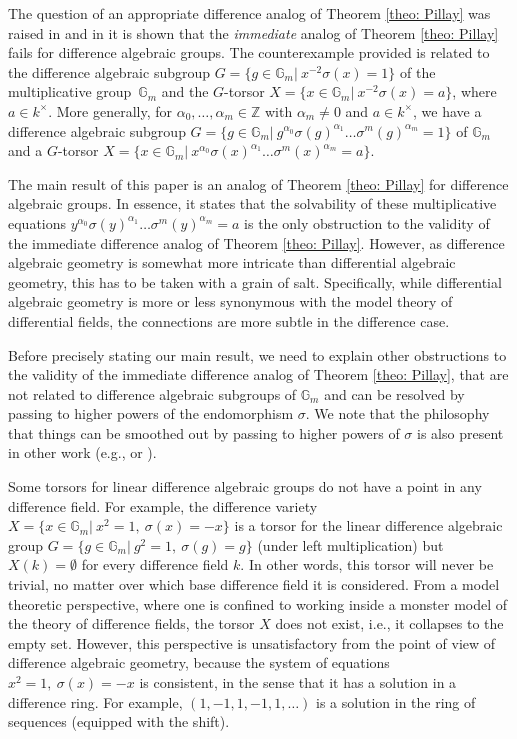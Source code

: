 \documentclass[oneside,reqno]{amsart}
\theoremstyle{definition}
\newcommand{\s}{\sigma}
\newcommand{\Gm}{\mathbb{G}_m}
\newcommand{\ZZ}{\mathbb{Z}}
\begin{document}
The question of an appropriate difference analog of Theorem \ref{theo: Pillay} was raised in \cite[Section~3]{Pillay:ThePicardVessiotTheoryConstrainedCohomology} and in \cite{ChatzidakisPillay:GeneralizedPVExtensionsAndDifferentialGaloisCohomology} it is shown that the \emph{immediate} analog of Theorem \ref{theo: Pillay} fails for difference algebraic groups. The counterexample provided is related to the difference algebraic subgroup $G=\{g\in\Gm|\ x^{-2}\s(x)=1\}$ of the multiplicative group~$\Gm$ and the $G$-torsor $X=\{x\in\Gm|\  x^{-2}\s(x)=a\}$, where $a\in k^\times$. More generally, for $\alpha_0,\ldots,\alpha_m\in\ZZ$ with $\alpha_m\neq 0$ and $a\in k^\times$, we have a difference algebraic subgroup $G=\{g\in\Gm|\ g^{\alpha_0}\s(g)^{\alpha_1}\ldots\s^m(g)^{\alpha_m}=1\}$ of $\Gm$ and a $G$-torsor $X=\{x\in\Gm|\ x^{\alpha_0}\s(x)^{\alpha_1}\ldots\s^m(x)^{\alpha_m}=a\}$.

The main result of this paper is an analog of Theorem \ref{theo: Pillay} for difference algebraic groups.
In essence, it states that the solvability of these multiplicative equations $y^{\alpha_0}\s(y)^{\alpha_1}\ldots\s^m(y)^{\alpha_m}=a$ is the only obstruction to the validity of the immediate difference analog of Theorem \ref{theo: Pillay}. However, as difference algebraic geometry is somewhat more intricate than differential algebraic geometry, this has to be taken with a grain of salt. Specifically, while differential algebraic geometry is more or less synonymous with the model theory of differential fields, the connections are more subtle in the difference case.



Before precisely stating our main result, we need to explain other obstructions to the validity of the immediate difference analog of Theorem \ref{theo: Pillay}, that are not related to difference algebraic subgroups of $\Gm$ and can be resolved by passing to higher powers of the endomorphism $\s$. We note that the philosophy that things can be smoothed out by passing to higher powers of $\s$ is also present in other work (e.g., \cite{ChatzidakiHrushovskiPeterzil:ModelTheoryofDifferenceFieldsIIPeriodicIdelas} or \cite{Wibmer:Chevalley}).

Some torsors for linear difference algebraic groups do not have a point in any difference field. For example, the difference variety $X=\{x\in \Gm|\ x^2=1,\ \s(x)=-x\}$ is a torsor for the linear difference algebraic group $G=\{g\in\Gm|\ g^2=1,\ \s(g)=g\}$ (under left multiplication) but $X(k)=\emptyset$ for every difference field $k$. In other words, this torsor will never be trivial, no matter over which base difference field it is considered.
From a model theoretic perspective, where one is confined to working inside a monster model of the theory of difference fields, the torsor $X$ does not exist, i.e., it collapses to the empty set. However, this perspective is unsatisfactory from the point of view of difference algebraic geometry, because the system of equations $x^2=1,\ \sigma(x)=-x$ is consistent, in the sense that it has a solution in a difference ring. For example, $(1,-1,1,-1,1,\ldots)$ is a solution in the ring of sequences (equipped with the shift).
\end{document}

